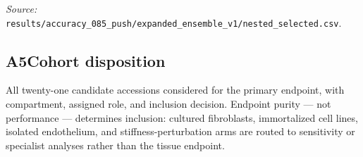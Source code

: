 \medskip
\noindent\textit{Source:}
\texttt{results/accuracy\_085\_push/expanded\_ensemble\_v1/nested\_selected.csv}.

\subsection*{A5\quad Cohort disposition}
\label{app:cohorts}

All twenty-one candidate accessions considered for the primary endpoint, with
compartment, assigned role, and inclusion decision. Endpoint purity --- not
performance --- determines inclusion: cultured fibroblasts, immortalized cell
lines, isolated endothelium, and stiffness-perturbation arms are routed to
sensitivity or specialist analyses rather than the tissue endpoint.

